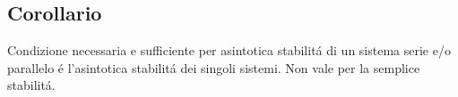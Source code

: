 \documentclass[../main.tex]{subfiles}
\begin{document}
	\subsection{Corollario}
		Condizione necessaria e sufficiente per asintotica stabilit\'a di un sistema serie e/o parallelo \'e l'asintotica stabilit\'a dei singoli sistemi. Non vale per la semplice stabilit\'a.
\end{document}

